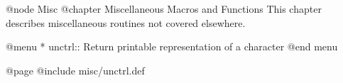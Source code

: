 @node Misc
@chapter Miscellaneous Macros and Functions
This chapter describes miscellaneous routines not covered elsewhere.

@menu 
* unctrl::   Return printable representation of a character
@end menu

@page
@include misc/unctrl.def
